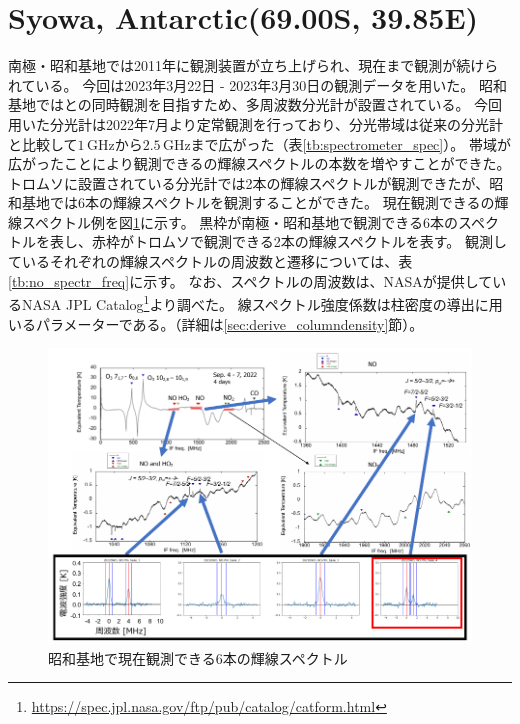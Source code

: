 \section{Syowa, Antarctic(69.00\textdegree S, 39.85\textdegree E)}
\label{sec:mm_syowa}
南極・昭和基地では2011年に観測装置が立ち上げられ、現在まで観測が続けられている。
今回は2023年3月22日 - 2023年3月30日の観測データを用いた。
昭和基地ではとの同時観測を目指すため、多周波数分光計が設置されている。
今回用いた分光計は2022年7月より定常観測を行っており、分光帯域は従来の分光計と比較して$1\, \mathrm{GHz}$から$2.5\, \mathrm{GHz}$まで広がった（表\ref{tb:spectrometer_spec}）。
帯域が広がったことにより観測できるの輝線スペクトルの本数を増やすことができた。トロムソに設置されている分光計では2本の輝線スペクトルが観測できたが、昭和基地では6本の輝線スペクトルを観測することができた。
現在観測できるの輝線スペクトル例を図\ref{fig:NO_spectr}に示す。
黒枠が南極・昭和基地で観測できる6本のスペクトルを表し、赤枠がトロムソで観測できる2本の輝線スペクトルを表す。
観測しているそれぞれの輝線スペクトルの周波数と遷移については、表\ref{tb:no_spectr_freq}に示す。
なお、スペクトルの周波数は、NASAが提供しているNASA JPL Catalog\footnote{\url{https://spec.jpl.nasa.gov/ftp/pub/catalog/catform.html}}より調べた。
線スペクトル強度係数は柱密度の導出に用いるパラメーターである。（詳細は\ref{sec:derive_columndensity}節）。
\begin{figure}[htbp]
    \centering
    \includegraphics[width=\linewidth]{master_thesis_contents/master_thesis_fig/NO_spectr.pdf}
    \caption{昭和基地で現在観測できる6本の輝線スペクトル}
    \label{fig:NO_spectr}
\end{figure}

